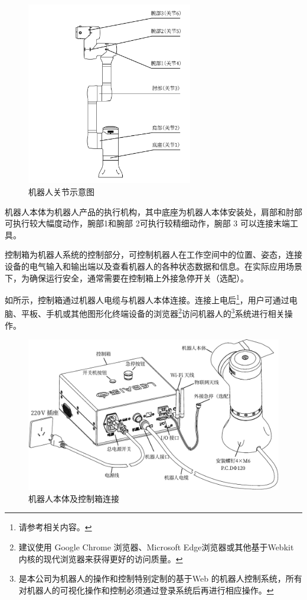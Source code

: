 \begin{figure}[ht]
    \centering
    \includegraphics[height=8cm]{image/arms.pdf}
    \caption{机器人关节示意图}
    \label{fig:机器人关节示意图}
\end{figure}

机器人本体为机器人产品的执行机构，其中底座为机器人本体安装处，肩部和肘部可执行较大幅度动作，腕部1和腕部 2可执行较精细动作，腕部 3 可以连接末端工具。

控制箱为机器人系统的控制部分，可控制机器人在工作空间中的位置、姿态，连接设备的电气输入和输出端以及查看机器人的各种状态数据和信息。在实际应用场景下，为确保运行安全，通常需要在控制箱上外接急停开关（选配）。

\clearpage

如所示，控制箱通过机器人电缆与机器人本体连接。连接上电后\footnote{请参考相关内容。}，用户可通过电脑、平板、手机或其他图形化终端设备的浏览器\footnote{建议使用 Google Chrome 浏览器、Microsoft Edge浏览器或其他基于Webkit 内核的现代浏览器来获得更好的访问质量。 }访问机器人的\LM\footnote{\LM 是本公司为机器人的操作和控制特别定制的基于Web 的机器人控制系统，所有对机器人的可视化操作和控制必须通过登录\LM 系统后再进行相应操作。}系统进行相关操作。

\begin{figure}[ht]
    \centering
    \includegraphics[width=\textwidth]{line_graphs/robot_links.pdf}
    \caption{机器人本体及控制箱连接}
    \label{fig:机器人本体及控制箱连接}
\end{figure}

